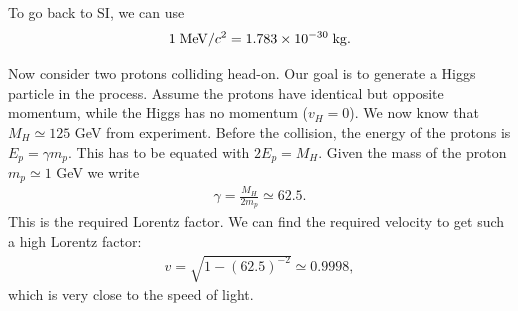 \documentclass[12pt]{article}
\newcommand{\be}{\begin{eqnarray}}
\newcommand{\ee}{\end{eqnarray}}
\newif\ifshowboardanswers
\newif\ifshowboardquestion
\newcommand{\boardanswer}[1]{\ifshowboardanswers\\[0.35em]\textcolor{blue}{\textbf{Answer.} #1}\fi}
\begin{document}
To go back to SI, we can use
\be
1\;{\rm MeV}/c^2 = 1.783\times10^{-30}\;{\rm kg}. 
\ee

Now consider two protons colliding head-on. Our goal is to generate a Higgs particle in the process. Assume the protons have identical but opposite momentum, while the Higgs has no momentum ($v_H = 0$). We now know that $M_H \simeq  125$ GeV from experiment. Before the collision, the energy of the protons is $E_p = \gamma m_p$. This has to be equated with $2E_p = M_H$. Given the mass of the proton $m_p \simeq 1$ GeV we write 
\be
\gamma = \frac{M_H}{2 m_p} \simeq 62.5. 
\ee
This is the required Lorentz factor. We can find the required velocity to get such a high Lorentz factor:
\be
v = \sqrt{1-(62.5)^{-2}} \simeq 0.9998,
\ee
which is very close to the speed of light. 
\ifshowboardquestion
\section*{Board Question}
\begin{tcolorbox}[colback=blue!5!white]
A particle of mass $M$ is initially at rest and decays into two identical particles of mass $m$.
\begin{enumerate}
    \item Use momentum conservation to determine the directions of the two daughter particles.
    \boardanswer{The initial momentum is zero, so the daughter momenta must be equal in magnitude and opposite in direction.}
    \item Use energy conservation to find the energy of each daughter particle.
    \boardanswer{By symmetry each daughter carries half the initial rest energy: $E_1=E_2=M/2$ in units with $c=1$.}
    \item Find the speed of each daughter particle in terms of $M$ and $m$.
    \boardanswer{$\gamma m=M/2$, so $\gamma=M/(2m)$ and $v=\sqrt{1-1/\gamma^2}=\sqrt{1-4m^2/M^2}$.}
    \item What condition on $M$ and $m$ is required for the decay to be possible?
    \boardanswer{We need $M\geq2m$. Equality means the daughters are produced at rest; for motion, $M>2m$.}
\end{enumerate}
\end{tcolorbox}
\fi
\end{document}
